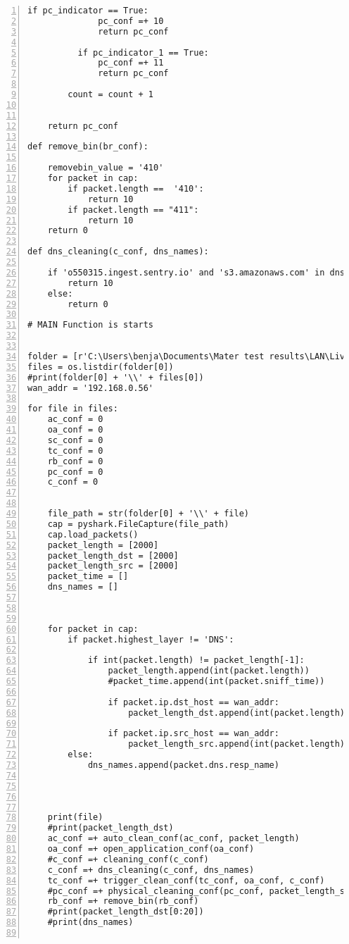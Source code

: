 \begin{lstlisting}[numbers=left]
          if pc_indicator == True:
              pc_conf =+ 10
              return pc_conf
          
          if pc_indicator_1 == True:
              pc_conf =+ 11
              return pc_conf
        
        count = count + 1
    

    return pc_conf

def remove_bin(br_conf):

    removebin_value = '410'
    for packet in cap:
        if packet.length ==  '410':
            return 10
        if packet.length == "411":
            return 10
    return 0

def dns_cleaning(c_conf, dns_names):
    
    if 'o550315.ingest.sentry.io' and 's3.amazonaws.com' in dns_names:
        return 10
    else:
        return 0

# MAIN Function is starts


folder = [r'C:\Users\benja\Documents\Mater test results\LAN\Live\Env3_dns']
files = os.listdir(folder[0])
#print(folder[0] + '\\' + files[0])
wan_addr = '192.168.0.56'

for file in files:
    ac_conf = 0
    oa_conf = 0
    sc_conf = 0
    tc_conf = 0
    rb_conf = 0
    pc_conf = 0
    c_conf = 0
    

    file_path = str(folder[0] + '\\' + file)
    cap = pyshark.FileCapture(file_path)
    cap.load_packets()
    packet_length = [2000]
    packet_length_dst = [2000]
    packet_length_src = [2000]
    packet_time = []
    dns_names = []
    


    for packet in cap:
        if packet.highest_layer != 'DNS':

            if int(packet.length) != packet_length[-1]:
                packet_length.append(int(packet.length))
                #packet_time.append(int(packet.sniff_time))

                if packet.ip.dst_host == wan_addr:
                    packet_length_dst.append(int(packet.length))

                if packet.ip.src_host == wan_addr:
                    packet_length_src.append(int(packet.length))
        else:
            dns_names.append(packet.dns.resp_name)
    

                

    print(file)
    #print(packet_length_dst)
    ac_conf =+ auto_clean_conf(ac_conf, packet_length)
    oa_conf =+ open_application_conf(oa_conf)
    #c_conf =+ cleaning_conf(c_conf)
    c_conf =+ dns_cleaning(c_conf, dns_names)
    tc_conf =+ trigger_clean_conf(tc_conf, oa_conf, c_conf)
    #pc_conf =+ physical_cleaning_conf(pc_conf, packet_length_src)
    rb_conf =+ remove_bin(rb_conf)
    #print(packet_length_dst[0:20])
    #print(dns_names)


\end{lstlisting}
